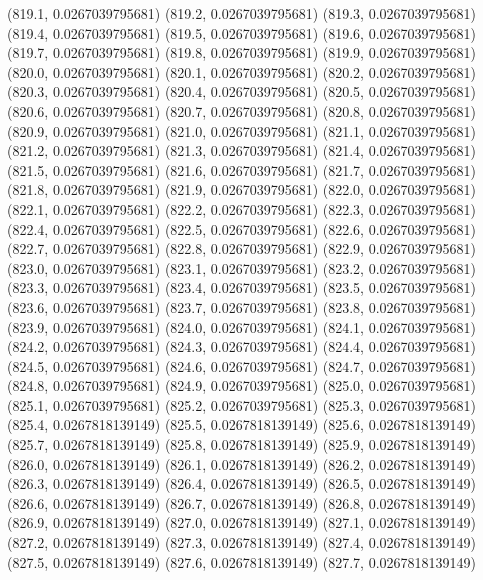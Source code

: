 {					(819.1, 0.0267039795681)
					(819.2, 0.0267039795681)
					(819.3, 0.0267039795681)
					(819.4, 0.0267039795681)
					(819.5, 0.0267039795681)
					(819.6, 0.0267039795681)
					(819.7, 0.0267039795681)
					(819.8, 0.0267039795681)
					(819.9, 0.0267039795681)
					(820.0, 0.0267039795681)
					(820.1, 0.0267039795681)
					(820.2, 0.0267039795681)
					(820.3, 0.0267039795681)
					(820.4, 0.0267039795681)
					(820.5, 0.0267039795681)
					(820.6, 0.0267039795681)
					(820.7, 0.0267039795681)
					(820.8, 0.0267039795681)
					(820.9, 0.0267039795681)
					(821.0, 0.0267039795681)
					(821.1, 0.0267039795681)
					(821.2, 0.0267039795681)
					(821.3, 0.0267039795681)
					(821.4, 0.0267039795681)
					(821.5, 0.0267039795681)
					(821.6, 0.0267039795681)
					(821.7, 0.0267039795681)
					(821.8, 0.0267039795681)
					(821.9, 0.0267039795681)
					(822.0, 0.0267039795681)
					(822.1, 0.0267039795681)
					(822.2, 0.0267039795681)
					(822.3, 0.0267039795681)
					(822.4, 0.0267039795681)
					(822.5, 0.0267039795681)
					(822.6, 0.0267039795681)
					(822.7, 0.0267039795681)
					(822.8, 0.0267039795681)
					(822.9, 0.0267039795681)
					(823.0, 0.0267039795681)
					(823.1, 0.0267039795681)
					(823.2, 0.0267039795681)
					(823.3, 0.0267039795681)
					(823.4, 0.0267039795681)
					(823.5, 0.0267039795681)
					(823.6, 0.0267039795681)
					(823.7, 0.0267039795681)
					(823.8, 0.0267039795681)
					(823.9, 0.0267039795681)
					(824.0, 0.0267039795681)
					(824.1, 0.0267039795681)
					(824.2, 0.0267039795681)
					(824.3, 0.0267039795681)
					(824.4, 0.0267039795681)
					(824.5, 0.0267039795681)
					(824.6, 0.0267039795681)
					(824.7, 0.0267039795681)
					(824.8, 0.0267039795681)
					(824.9, 0.0267039795681)
					(825.0, 0.0267039795681)
					(825.1, 0.0267039795681)
					(825.2, 0.0267039795681)
					(825.3, 0.0267039795681)
					(825.4, 0.0267818139149)
					(825.5, 0.0267818139149)
					(825.6, 0.0267818139149)
					(825.7, 0.0267818139149)
					(825.8, 0.0267818139149)
					(825.9, 0.0267818139149)
					(826.0, 0.0267818139149)
					(826.1, 0.0267818139149)
					(826.2, 0.0267818139149)
					(826.3, 0.0267818139149)
					(826.4, 0.0267818139149)
					(826.5, 0.0267818139149)
					(826.6, 0.0267818139149)
					(826.7, 0.0267818139149)
					(826.8, 0.0267818139149)
					(826.9, 0.0267818139149)
					(827.0, 0.0267818139149)
					(827.1, 0.0267818139149)
					(827.2, 0.0267818139149)
					(827.3, 0.0267818139149)
					(827.4, 0.0267818139149)
					(827.5, 0.0267818139149)
					(827.6, 0.0267818139149)
					(827.7, 0.0267818139149)
}
